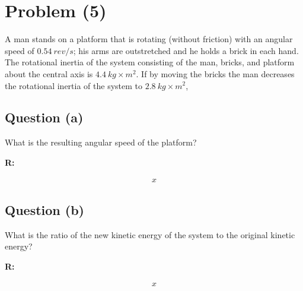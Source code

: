 \section{Problem (5)}
	A man stands on a platform that is rotating (without friction) with an angular speed of $0.54 \ rev/s$; his arms are outstretched and he holds a brick in each hand. The rotational inertia of the system consisting of the man, bricks, and platform about the central axis is $4.4 \ kg \times m^{2}$. If by moving the bricks the man decreases the rotational inertia of the system to $2.8 \ kg \times m^{2}$,

	\subsection{Question (a)}

		What is the resulting angular speed of the platform?

		\textbf{R:}

		\begin{align}
			x
		\end{align}

	\subsection{Question (b)}

		What is the ratio of the new kinetic energy of the system to the original kinetic energy?

		\textbf{R:}

		\begin{align}
			x
		\end{align}
